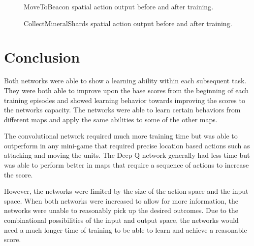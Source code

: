 \begin{figure}[h]
    \centering
    \caption{MoveToBeacon spatial action output before and after training.}%
    \label{fig:cnn-filter1}%
\end{figure}

\begin{figure}[h]
    \centering
    \caption{CollectMineralShards spatial action output before and after training.}%
    \label{fig:cnn-filter2}%
\end{figure}

\section{Conclusion}

Both networks were able to show a learning ability within each subsequent task. They were both able to improve upon the base scores from the beginning of each training episodes and showed learning behavior towards improving the scores to the networks capacity. The networks were able to learn certain behaviors from different maps and apply the same abilities to some of the other maps. 

The convolutional network required much more training time but was able to outperform in any mini-game that required precise location based actions such as attacking and moving the units. The Deep Q network generally had less time but was able to perform better in maps that require a sequence of actions to increase the score. 

However, the networks were limited by the size of the action space and the input space. When both networks were increased to allow for more information, the networks were unable to reasonably pick up the desired outcomes. Due to the combinational possibilities of the input and output space, the networks would need a much longer time of training to be able to learn and achieve a reasonable score. 
